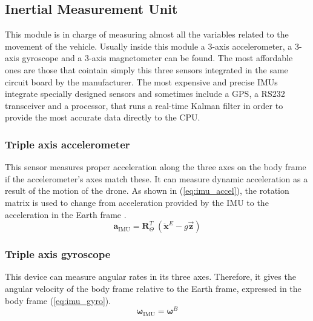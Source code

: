 \documentclass[journal]{IEEEtran}
\newcommand*{\subb}[1]{_{\mathrm{#1}}}
\begin{document}
		\subsection{Inertial Measurement Unit}
		This module is in charge of measuring almost all the variables related to the movement of the vehicle. Usually inside this module  a 3-axis accelerometer, a 3-axis gyroscope and a 3-axis magnetometer can be found. The most affordable ones are those that cointain simply this three sensors integrated in the same circuit board by the manufacturer. The most expensive and precise IMUs integrate specially designed sensors and sometimes include a GPS, a RS232 transceiver and a processor, that runs a real-time Kalman filter in order to provide the most accurate data directly to the CPU. \\
		

		\subsubsection{Triple axis accelerometer} This sensor measures proper acceleration along the three axes on the body frame if the accelerometer's axes match these. It can measure dynamic acceleration as a result of the motion of the drone.  As shown in (\ref{eq:imu_accel}), the rotation matrix is used to change from acceleration provided by the IMU to the acceleration in the Earth frame \cite{modelling_control_mahony}.\\
		\begin{equation} \label{eq:imu_accel}
		\bm{a}\subb{IMU}= \bm{R}^T_\Theta \ (\bm{\ddot{x}}^E - g \bm{\vec{z}})
		\end{equation}
		
		\subsubsection{Triple axis gyroscope} This device can measure angular rates in its three axes. Therefore, it  gives the angular velocity of the body frame relative to the Earth frame, expressed in the body frame (\ref{eq:imu_gyro}).\\
		\begin{equation} \label{eq:imu_gyro}
		\bm{\omega}\subb{IMU}= \bm{\omega}^B 
		\end{equation}
		
\end{document}

